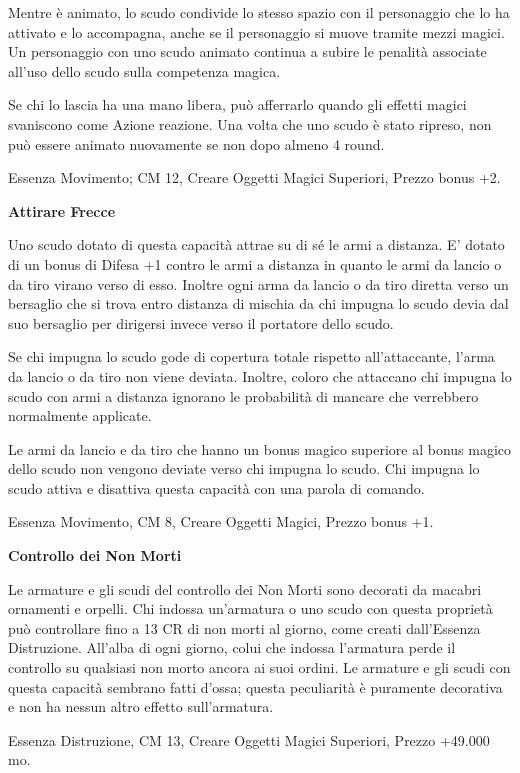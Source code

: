 \documentclass[a4paper,11pt,twoside,openany]{book}
\begin{document}
Mentre è animato, lo scudo condivide lo stesso spazio con il personaggio che lo ha attivato e lo accompagna, anche se il personaggio si muove tramite mezzi magici. Un personaggio con uno scudo animato continua a subire le penalità associate all'uso dello scudo sulla competenza magica.

Se chi lo lascia ha una mano libera, può afferrarlo quando gli effetti magici svaniscono come Azione reazione. Una volta che uno scudo è stato ripreso, non può essere animato nuovamente se non dopo almeno 4 round.

Essenza Movimento; CM 12, Creare Oggetti Magici Superiori, Prezzo bonus +2.

\textbf{Attirare Frecce}

Uno scudo dotato di questa capacità attrae su di sé le armi a distanza. E' dotato di un bonus di Difesa +1 contro le armi a distanza in quanto le armi da lancio o da tiro virano verso di esso. Inoltre ogni arma da lancio o da tiro diretta verso un bersaglio che si trova entro distanza di mischia da chi impugna lo scudo devia dal suo bersaglio per dirigersi invece verso il portatore dello scudo.

Se chi impugna lo scudo gode di copertura totale rispetto all'attaccante, l'arma da lancio o da tiro non viene deviata. Inoltre, coloro che attaccano chi impugna lo scudo con armi a distanza ignorano le probabilità di mancare che verrebbero normalmente applicate.

Le armi da lancio e da tiro che hanno un bonus magico superiore al bonus magico dello scudo non vengono deviate verso chi impugna lo scudo. Chi impugna lo scudo attiva e disattiva questa capacità con una parola di comando.

Essenza Movimento, CM 8, Creare Oggetti Magici, Prezzo bonus +1.

\textbf{Controllo dei Non Morti}

Le armature e gli scudi del controllo dei Non Morti sono decorati da macabri ornamenti e orpelli. Chi indossa un'armatura o uno scudo con questa proprietà può controllare fino a 13 CR di non morti al giorno, come creati dall'Essenza Distruzione. All'alba di ogni giorno, colui che indossa l'armatura perde il controllo su qualsiasi non morto ancora ai suoi ordini. Le armature e gli scudi con questa capacità sembrano fatti d'ossa; questa peculiarità è puramente decorativa e non ha nessun altro effetto sull'armatura.

Essenza Distruzione, CM 13, Creare Oggetti Magici Superiori, Prezzo +49.000 mo.
\end{document}
